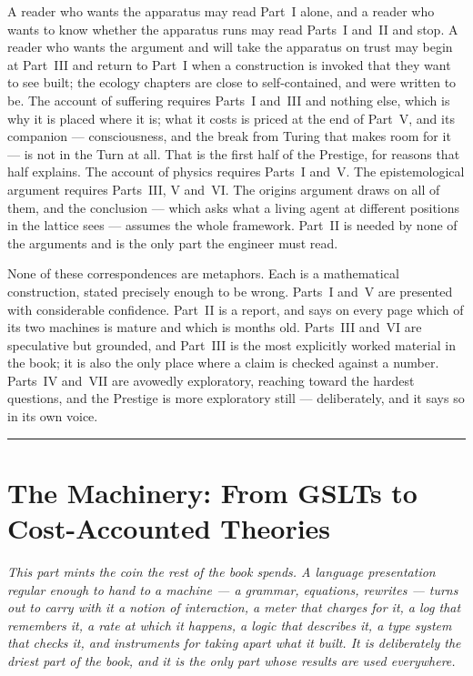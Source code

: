 \documentclass[12pt,openright,twoside]{book}
\theoremstyle{remark}
\theoremstyle{plain}
\theoremstyle{remark}
\theoremstyle{plain}
\theoremstyle{plain}
\begin{document}
A reader who wants the apparatus may read Part~I alone, and a reader who
wants to know whether the apparatus runs may read Parts~I and~II and stop.
A reader who wants the argument and will take the apparatus on trust may
begin at Part~III and return to Part~I when a construction is invoked that
they want to see built; the ecology chapters are close to
self-contained, and were written to be.
The account of suffering requires Parts~I and~III and nothing else, which
is why it is placed where it is; what it costs is priced at the end of
Part~V, and its companion --- consciousness, and the break from Turing
that makes room for it --- is not in the Turn at all.
That is the first half of the Prestige, for reasons that half explains.
The account of physics requires Parts~I and~V.
The epistemological argument requires Parts~III, V and~VI.
The origins argument draws on all of them, and the conclusion --- which
asks what a living agent at different positions in the lattice sees ---
assumes the whole framework.
Part~II is needed by none of the arguments and is the only part the
engineer must read.

None of these correspondences are metaphors.
Each is a mathematical construction, stated precisely enough to be wrong.
Parts~I and~V are presented with considerable confidence.
Part~II is a report, and says on every page which of its two machines is
mature and which is months old.
Parts~III and~VI are speculative but grounded, and Part~III is the most
explicitly worked material in the book; it is also the only place where a
claim is checked against a number.
Parts~IV and~VII are avowedly exploratory, reaching toward the hardest
questions, and the Prestige is more exploratory still --- deliberately, and
it says so in its own voice.

\bigskip
\noindent\hrule
\bigskip


\part{The Machinery: From GSLTs to Cost-Accounted Theories}
\label{part:machinery}

\vspace{1em}
\begin{mdframed}[backgroundcolor=remarkgray, linecolor=gray!60,
                 linewidth=1pt, topline=false, rightline=false,
                 bottomline=false]
\small\itshape
This part mints the coin the rest of the book spends.
A language presentation regular enough to hand to a machine --- a
grammar, equations, rewrites --- turns out to carry with it a notion of
interaction, a meter that charges for it, a log that remembers it, a
rate at which it happens, a logic that describes it, a type system that
checks it, and instruments for taking apart what it built.
It is deliberately the driest part of the book, and it is the only part
whose results are used everywhere.
\end{mdframed}
\end{document}

